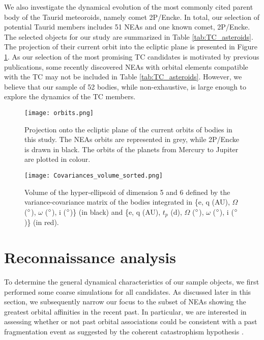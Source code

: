 \documentclass[letters,a4paper,fleqn,usenatbib]{mnras}
\begin{document}
We also investigate the dynamical evolution of the most commonly cited parent body of the Taurid meteoroids, namely comet 2P/Encke.  In total, our selection of potential Taurid members includes 51 NEAs and one known comet, 2P/Encke. The selected objects for our study are summarized in Table \ref{tab:TC_asteroids}. The projection of their current orbit into the ecliptic plane is presented in Figure \ref{fig:orbits}.  As our selection of the most promising TC candidates is motivated by previous publications, some recently discovered NEAs with orbital elements compatible with the TC may not be included in Table \ref{tab:TC_asteroids}. However, we believe that our sample of 52 bodies, while non-exhaustive, is large enough to explore the dynamics of the TC members. 


\begin{figure}
  \centering
  \texttt{[image: orbits.png]}
  \caption{Projection onto the ecliptic plane of the current orbits of bodies in this study. The NEAs orbits are represented in grey, while 2P/Encke is drawn in black. The orbits of the planets from Mercury to Jupiter are plotted in colour.}
  \label{fig:orbits}
\end{figure}

\begin{figure*}
    \centering
    \texttt{[image: Covariances\_volume\_sorted.png]}
    \caption{Volume of the hyper-ellipsoid of dimension 5 and 6 defined by the variance-covariance matrix of the bodies integrated in \{e, q (AU), $\Omega$ ($\degree$), $\omega$ ($\degree$), i ($\degree$)\} (in black) and \{e, q (AU), ${t_p}$ (d), $\Omega$ ($\degree$), $\omega$ ($\degree$), i ($\degree$)\} (in red).}
    \label{fig:covariances_volume}
\end{figure*}

\section{Reconnaissance analysis} 

To determine the general dynamical characteristics of our sample objects, we first performed some coarse simulations for all candidates. As discussed later in this section, we subsequently narrow our focus to the subset of NEAs showing the greatest orbital affinities in the recent past. In particular, we are interested in assessing whether or not past orbital associations could be consistent with a past fragmentation event as suggested by the coherent catastrophism hypothesis \citep{Asher1994}.  
\end{document}
